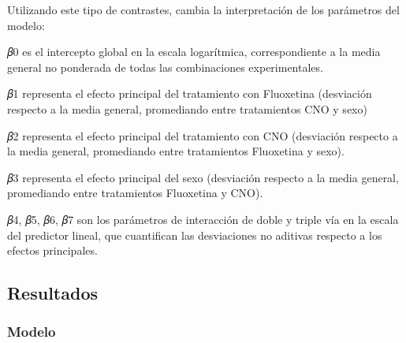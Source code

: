 \documentclass[
  letterpaper,
  DIV=11,
  numbers=noendperiod]{scrartcl}
\begin{document}
Utilizando este tipo de contrastes, cambia la interpretación de los
parámetros del modelo:

𝛽0 es el intercepto global en la escala logarítmica, correspondiente a
la media general no ponderada de todas las combinaciones experimentales.

𝛽1 representa el efecto principal del tratamiento con Fluoxetina
(desviación respecto a la media general, promediando entre tratamientos
CNO y sexo)

𝛽2 representa el efecto principal del tratamiento con CNO (desviación
respecto a la media general, promediando entre tratamientos Fluoxetina y
sexo).

𝛽3 representa el efecto principal del sexo (desviación respecto a la
media general, promediando entre tratamientos Fluoxetina y CNO).

𝛽4, 𝛽5, 𝛽6, 𝛽7 son los parámetros de interacción de doble y triple vía
en la escala del predictor lineal, que cuantifican las desviaciones no
aditivas respecto a los efectos principales.

\subsection{Resultados}\label{resultados}

\subsubsection{Modelo}\label{modelo}
\end{document}
